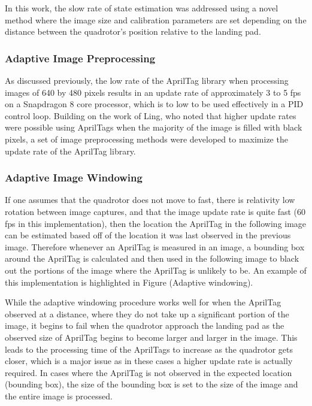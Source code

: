 \documentclass[11pt, twocolumn]{article}
\begin{document}
In this work, the slow rate of state estimation was addressed using a novel method where the image size and calibration parameters are set depending on the distance between the quadrotor's position relative to the landing pad. 

\subsubsection{Adaptive Image Preprocessing}

As discussed previously, the low rate of the AprilTag library when processing images of 640 by 480 pixels results in an update rate of approximately 3 to 5 fps on a Snapdragon 8 core processor, which is to low to be used effectively in a PID control loop. Building on the work of Ling, who noted that higher update rates were possible using AprilTags when the majority of the image is filled with black pixels, a set of image preprocessing methods were developed to maximize the update rate of the AprilTag library. 

\subsubsection{Adaptive Image Windowing}

If one assumes that the quadrotor does not move to fast, there is relativity low rotation between image captures, and that the image update rate is quite fast (60 fps in this implementation), then the location the AprilTag in the following image can be estimated based off of the location it was last observed in the previous image. Therefore whenever an AprilTag is measured in an image, a bounding box around the AprilTag is calculated and then used in the following image to black out the portions of the image where the AprilTag is unlikely to be. An example of this implementation is highlighted in Figure (Adaptive windowing).


While the adaptive windowing procedure works well for when the AprilTag observed at a distance, where they do not take up a significant portion of the image, it begins to fail when the quadrotor approach the landing pad as the observed size of AprilTag begins to become larger and larger in the  image. This leads to the processing time of the AprilTags to increase as the quadrotor gets closer, which is a major issue as in these cases a higher update rate is actually required. In cases where the AprilTag is not observed in the expected location (bounding box), the size of the bounding box is set to the size of the image and the entire image is processed. 
\end{document}
